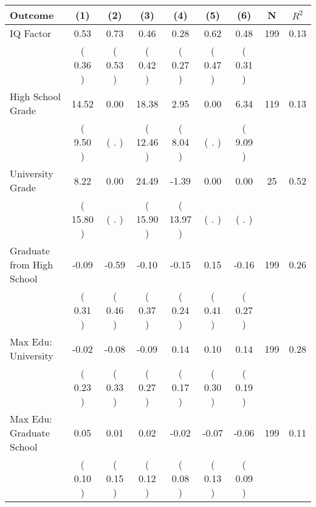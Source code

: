 \begin{tabular}{lcccccccc}
\toprule
 \textbf{Outcome} & \textbf{(1)} & \textbf{(2)} & \textbf{(3)} & \textbf{(4)} & \textbf{(5)} & \textbf{(6)} & \textbf{N} & \textbf{$ R^2$} \\
\midrule
IQ Factor &      0.53 &      0.73 &      0.46 &      0.28 &      0.62 &      0.48 & 199 &       0.13 \\ 
 & (     0.36 ) & (     0.53 ) & (     0.42 ) & (     0.27 ) & (     0.47 ) & (     0.31 ) & \\
High School Grade &     14.52 &      0.00 &     18.38 &      2.95 &      0.00 &      6.34 & 119 &       0.13 \\ 
 & (     9.50 ) & (        . ) & (    12.46 ) & (     8.04 ) & (        . ) & (     9.09 ) & \\
University Grade &      8.22 &      0.00 &     24.49 &     -1.39 &      0.00 &      0.00 & 25 &       0.52 \\ 
 & (    15.80 ) & (        . ) & (    15.90 ) & (    13.97 ) & (        . ) & (        . ) & \\
Graduate from High School &     -0.09 &     -0.59 &     -0.10 &     -0.15 &      0.15 &     -0.16 & 199 &       0.26 \\ 
 & (     0.31 ) & (     0.46 ) & (     0.37 ) & (     0.24 ) & (     0.41 ) & (     0.27 ) & \\
Max Edu: University &     -0.02 &     -0.08 &     -0.09 &      0.14 &      0.10 &      0.14 & 199 &       0.28 \\ 
 & (     0.23 ) & (     0.33 ) & (     0.27 ) & (     0.17 ) & (     0.30 ) & (     0.19 ) & \\
Max Edu: Graduate School &      0.05 &      0.01 &      0.02 &     -0.02 &     -0.07 &     -0.06 & 199 &       0.11 \\ 
 & (     0.10 ) & (     0.15 ) & (     0.12 ) & (     0.08 ) & (     0.13 ) & (     0.09 ) & \\
\bottomrule
\end{tabular}
